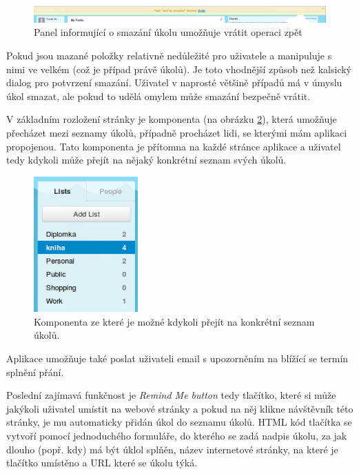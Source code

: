 \begin{figure}[htb]
\begin{center}
\includegraphics[width=130mm]{./pictures/astrid-undo.png}
\caption{Panel informující o smazání úkolu umožňuje vrátit operaci zpět}
\label{fig:astrid-undo}
\end{center}
\end{figure}


Pokud jsou mazané položky relativně nedůležité pro uživatele a manipuluje s nimi ve velkém (což je případ právě úkolů). Je toto vhodnější způsob než kalsický dialog pro potvrzení smazání. Uživatel v naprosté většině případů má v úmyslu úkol smazat, ale pokud to udělá omylem může smazání bezpečně vrátit. 

V základním rozložení stránky je komponenta (na obrázku \ref{fig:astrid-tasklist}), která umožňuje přecházet mezi seznamy úkolů, případně procházet lidi, se kterými mám aplikaci propojenou. Tato komponenta je přítomna na každé stránce aplikace a uživatel tedy kdykoli může přejít na nějaký konkrétní seznam svých úkolů.

\begin{figure}[htb]
\begin{center}
\includegraphics[width=40mm]{./pictures/astrid-tasklist.png}
\caption{Komponenta ze které je možné kdykoli přejít na konkrétní seznam úkolů.}
\label{fig:astrid-tasklist}
\end{center}
\end{figure}

Aplikace umožňuje také poslat uživateli email s upozorněním na blížící se termín splnění přání.

Poslední zajímavá funkčnost je \emph{Remind Me button} tedy tlačítko, které si může jakýkoli uživatel umístit na webové stránky a pokud na něj klikne návštěvník této stránky, je mu automaticky přidán úkol do seznamu úkolů. HTML kód tlačítka se vytvoří pomocí jednoduchého formuláře, do kterého se zadá nadpis úkolu, za jak dlouho (popř. kdy) má být úklol splňěn, název internetové stránky, na které je tlačítko umístěno a URL které se úkolu týká.

